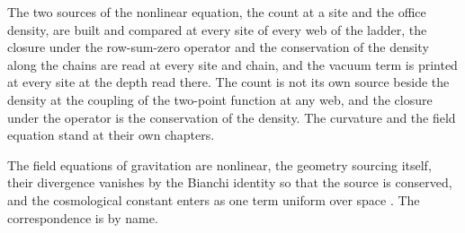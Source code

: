 The two sources of the nonlinear equation, the count at a site and the office density, are built and compared at every site of every web of the ladder, the closure under the row-sum-zero operator and the conservation of the density along the chains are read at every site and chain, and the vacuum term is printed at every site at the depth read there. The count is not its own source beside the density at the coupling of the two-point function at any web, and the closure under the operator is the conservation of the density. The curvature and the field equation stand at their own chapters.
\begin{chbridge}
The field equations of gravitation are nonlinear, the geometry sourcing itself, their divergence vanishes by the Bianchi identity so that the source is conserved, and the cosmological constant enters as one term uniform over space \cite{Einstein1916,Einstein1917,Wald1984}. The correspondence is by name.
\end{chbridge}
